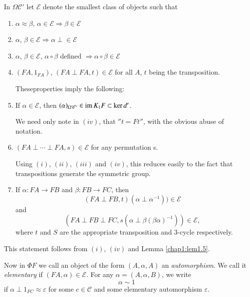 In $\Omega \mathscr{C}'$ let $\mathscr{E}$ denote the smallest class of 
objects such that  
\begin{enumerate}
\renewcommand{\theenumi}{\roman{enumi}}
\renewcommand{\labelenumi}{(\theenumi)}
\item $\alpha \approx \beta$, $\alpha \in \mathscr{E} \Rightarrow
  \beta \in \mathscr{E}$ 

\item $\alpha$, $\beta \in \mathscr{E} \Rightarrow \alpha \perp \in
  \mathscr{E}$ 

\item $\alpha$, $\beta \in \mathscr{E}$, $\alpha \circ \beta$ defined
  $\Rightarrow \alpha \circ \beta \in \mathscr{E}$  

\item $(FA, 1_{FA})$, $(FA \perp FA, t) \in \mathscr{E}$ for all $A$,
  $t$ being the transposition.  

These\pageoriginale properties imply the following:

\item If $\alpha \in \mathscr{E}$, then $(\alpha)_{\Omega
  \mathscr{C}'} \in \operatorname{im} K_1 F \subset \ker d'$. 

We need only note in $(iv)$, that $''t = Ft''$, with the obvious abuse
of notation. 

\item $(FA \perp \cdots \perp FA, s) \in \mathscr{E}$ for any
  permutation s. 

Using $(i)$, $(ii)$, $(iii)$ and $(iv)$, this reduces easily to the 
fact that transpositions generate the symmetric group. 

\item If $\alpha : FA \to FB$ and $\beta : FB \to FC$, then
$$
(FA \perp FB, t) (\alpha \perp \alpha^{-1})) \in \mathscr{E}
$$
and 
$$
(FA \perp FB \perp FC, s(\alpha \perp \beta (\beta \alpha)^{-1})) \in
\mathscr{E}, 
$$
where $t$ and $S$ are the appropriate transposition and 3-cycle
respectively.  
\end{enumerate}

This statement follows from $(i)$, $(iv)$ and Lemma \ref{chap1:lem1.5}. 

Now in $\Phi F$ we call an object of the form $(A, \alpha, A)$ an
\textit{automorphism}. We call it  \textit{elementary} if $(FA,
\alpha) \in \mathscr{E}$. For any $\alpha = (A, \alpha, B)$, we write 
$$
\alpha \sim 1
$$
if $\alpha \perp 1_{FC} \approx \varepsilon$ for some $c \in
\mathscr{C}$ and some elementary automorphism $\varepsilon$. 

